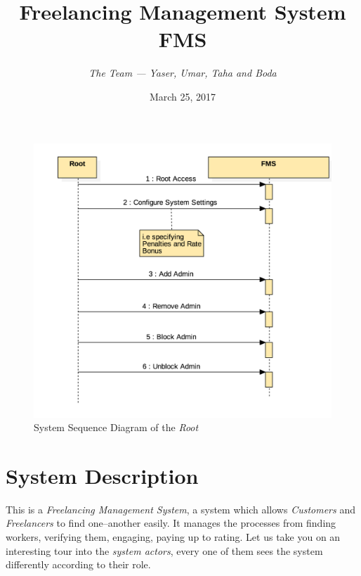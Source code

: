 \documentclass{article}
\begin{document}
    \title{Freelancing Management System \\
    \textbf{FMS}}
    \author{\textit{The Team --- Yaser, Umar, Taha and Boda}}
    \date{March 25, 2017}
\maketitle

\begin{figure}[ht!]
\centering
\includegraphics[width=128mm]{SystemSequanceDiagram_Root.png}
\caption{System Sequence Diagram of the \textit{Root}}
\end{figure}

\newpage
\tableofcontents
\newpage



\section{System Description}
  \hspace{0.5cm} This is a \textit{Freelancing Management System}, a system which
  allows \textit{Customers } and \textit{Freelancers} to find
  one--another easily. It manages the processes from finding workers,
  verifying them, engaging, paying up to rating.
  \hspace{0.3cm}Let us take you on an interesting tour into the
  \textit{system actors}, every one of them sees the system differently
  according to their role.
\end{document}
